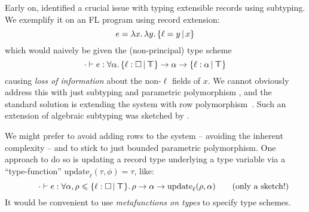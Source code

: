 Early on, \textcite{operations-on-records} identified a crucial issue with typing extensible records using subtyping. We exemplify it on an FL program using record extension:
$$ e = \fllam x \fllam y \flext{\ell = y}{x} $$
which would naively be given the (non-principal) type scheme
$$ \cdot \vdash e : \forall \alpha \ldotp \flext{\ell : \flabsent}{\flftop} \to \alpha \to \flext{\ell : \alpha}{\flftop} $$
causing \emph{loss of information} about the non-$\ell$ fields of $x$. We cannot obviously address this with just subtyping and parametric polymorphism \cite{cardelli-extensible-records-in-f-sub}, and the standard solution is extending the system with row polymorphism~\cite{remy-records, abstracting-extensible-data-types}. Such an extension of algebraic subtyping was sketched by \citeauthor*{algebraic-subtyping-row-polymorphism} \cite{algebraic-subtyping-row-polymorphism}.

We might prefer to avoid adding rows to the system -- avoiding the inherent complexity -- and to stick to just bounded parametric polymorphism. One approach to do so is updating a record type underlying a type variable via a \enquote{type-function} $\mathrm{update}_\ell(\tau, \phi) = \tau$, like:
$$ \qquad \cdot \vdash e : \forall \alpha, \rho \sub \flext{\ell : \flabsent}{\flftop} \ldotp \rho \to \alpha \to \mathrm{update}_\ell(\rho, \alpha) \qquad \text{(only a sketch!)} $$
It would be convenient to use \emph{metafunctions on types} to specify type schemes.

